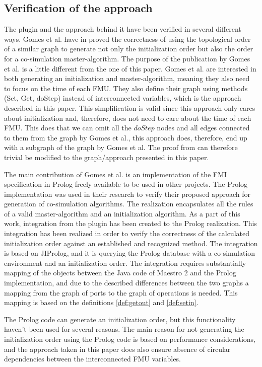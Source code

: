 \documentclass[runningheads]{llncs}
\begin{document}
\subsection{Verification of the approach}
The plugin and the approach behind it have been verified in several different ways. Gomes et al. have in \cite{gomes_lucio_vangheluwe_2019} proved the correctness of using the topological order of a similar graph to generate not only the initialization order but also the order for a co-simulation master-algorithm. The purpose of the publication by Gomes et al. is a little different from the one of this paper. Gomes et al. are interested in both generating an initialization and master-algorithm, meaning they also need to focus on the time of each FMU. They also define their graph using methods (Set, Get, doStep) instead of interconnected variables, which is the approach described in this paper. This simplification is valid since this approach only cares about initialization and, therefore, does not need to care about the time of each FMU. This does that we can omit all the $doStep$ nodes and all edges connected to them from the graph by Gomes et al., this approach does, therefore, end up with a subgraph of the graph by Gomes et al. The proof from \cite{gomes_lucio_vangheluwe_2019} can therefore trivial be modified to the graph/approach presented in this paper.

The main contribution of Gomes et al. is an implementation of the FMI specification in Prolog freely available to be used in other projects. The Prolog implementation was used in their research to verify their proposed approach for generation of co-simulation algorithms. The realization encapsulates all the rules of a valid master-algorithm and an initialization algorithm. As a part of this work, integration from the plugin has been created to the Prolog realization. This integration has been realized in order to verify the correctness of the calculated initialization order against an established and recognized method. The integration is based on JIProlog\cite{}, and it is querying the Prolog database with a co-simulation environment and an initialization order. The integration requires substantially mapping of the objects between the Java code of Maestro 2 and the Prolog implementation, and due to the described differences between the two graphs a mapping from the graph of ports to the graph of operations is needed. This mapping is based on the definitions \ref{def:getout} and \ref{def:setin}.

The Prolog code can generate an initialization order, but this functionality haven't been used for several reasons. The main reason for not generating the initialization order using the Prolog code is based on performance considerations, and the approach taken in this paper does also ensure absence of circular dependencies between the interconnected FMU variables. 
\end{document}
